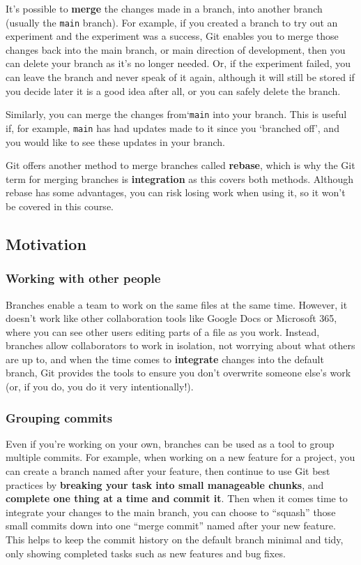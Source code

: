 \documentclass[
  letterpaper,
  DIV=11,
  numbers=noendperiod]{scrartcl}
\begin{document}
It's possible to \textbf{merge} the changes made in a branch, into
another branch (usually the \texttt{main} branch). For example, if you
created a branch to try out an experiment and the experiment was a
success, Git enables you to merge those changes back into the main
branch, or main direction of development, then you can delete your
branch as it's no longer needed. Or, if the experiment failed, you can
leave the branch and never speak of it again, although it will still be
stored if you decide later it is a good idea after all, or you can
safely delete the branch.

Similarly, you can merge the changes from`\texttt{main} into your
branch. This is useful if, for example, \texttt{main} has had updates
made to it since you `branched off', and you would like to see these
updates in your branch.

Git offers another method to merge branches called \textbf{rebase},
which is why the Git term for merging branches is \textbf{integration}
as this covers both methods. Although rebase has some advantages, you
can risk losing work when using it, so it won't be covered in this
course.

\subsection{Motivation}\label{motivation}

\subsubsection{Working with other
people}\label{working-with-other-people}

Branches enable a team to work on the same files at the same time.
However, it doesn't work like other collaboration tools like Google Docs
or Microsoft 365, where you can see other users editing parts of a file
as you work. Instead, branches allow collaborators to work in isolation,
not worrying about what others are up to, and when the time comes to
\textbf{integrate} changes into the default branch, Git provides the
tools to ensure you don't overwrite someone else's work (or, if you do,
you do it very intentionally!).

\subsubsection{Grouping commits}\label{grouping-commits}

Even if you're working on your own, branches can be used as a tool to
group multiple commits. For example, when working on a new feature for a
project, you can create a branch named after your feature, then continue
to use Git best practices by \textbf{breaking your task into small
manageable chunks}, and \textbf{complete one thing at a time and commit
it}. Then when it comes time to integrate your changes to the main
branch, you can choose to ``squash'' those small commits down into one
``merge commit'' named after your new feature. This helps to keep the
commit history on the default branch minimal and tidy, only showing
completed tasks such as new features and bug fixes.
\end{document}
